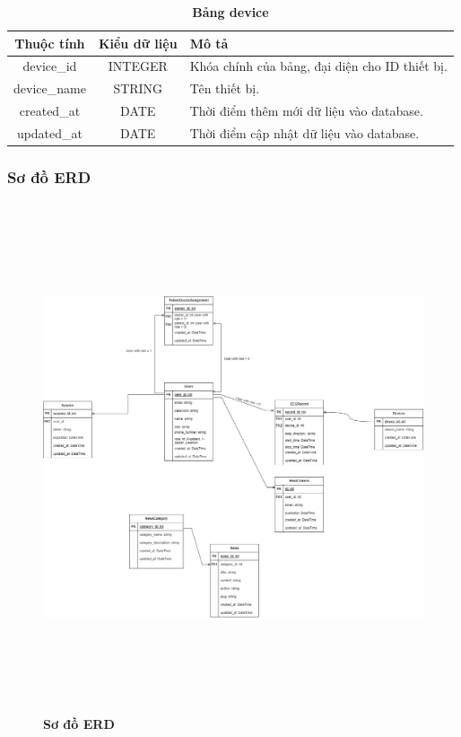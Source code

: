 \begin{table}[H]
  \caption{\bfseries \fontsize{12pt}{0pt}\selectfont Bảng device}
  \centering
  \begin{tabularx}{0.9\textwidth}{|c|c|X|}
    \hline
    \textbf{Thuộc tính} & \textbf{Kiểu dữ liệu} & \textbf{Mô tả} \\
    \hline
    device\_id & INTEGER & Khóa chính của bảng, đại diện cho ID thiết bị. \\
    \hline
    device\_name & STRING & Tên thiết bị. \\
    \hline
    created\_at & DATE & Thời điểm thêm mới dữ liệu vào database. \\
    \hline
    updated\_at & DATE & Thời điểm cập nhật dữ liệu vào database. \\
    \hline
  \end{tabularx}
\end{table}

\subsubsection{Sơ đồ ERD}

\begin{figure}[H]
  \centering
  \includegraphics[width=15cm,height=15cm]{Images/server/database/fmECG_architecture-Database.drawio.png}
  \caption[Sơ đồ ERD]{\bfseries \fontsize{12pt}{0pt}\selectfont Sơ đồ ERD}
  \label{fmECG_architecture-Database} %
\end{figure}


